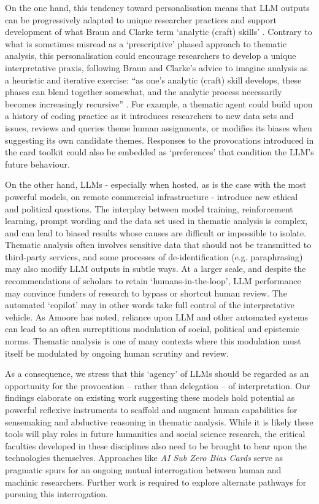 \documentclass{article}
\begin{document}
On the one hand, this tendency toward personalisation means that LLM outputs can be progressively adapted to unique researcher practices and support development of what Braun and Clarke term  `analytic (craft) skills' \cite{braunOneSizeFits2021}. Contrary to what is sometimes misread as a `prescriptive' phased approach to thematic analysis, this personalisation could encourage researchers to develop a unique interpretative praxis, following Braun and Clarke's advice to imagine analysis as a heuristic and iterative exercise: ``as one's analytic (craft) skill develops, these phases can blend together somewhat, and the analytic process necessarily becomes increasingly recursive'' \cite{braunOneSizeFits2021}. For example, a thematic agent could build upon a history of coding practice as it introduces researchers to new data sets and issues, reviews and queries theme human assignments, or modifies its biases when suggesting its own candidate themes. Responses to the provocations introduced in the card toolkit could also be embedded as `preferences' that condition the LLM's future behaviour. 

On the other hand, LLMs - especially when hosted, as is the case with the most powerful models, on remote commercial infrastructure - introduce new ethical and political questions. The interplay between model training, reinforcement learning, prompt wording and the data set used in thematic analysis is complex, and can lead to biased results whose causes are difficult or impossible to isolate. Thematic analysis often involves sensitive data that should not be transmitted to third-party services, and some processes of de-identification (e.g. paraphrasing) may also modify LLM outputs in subtle ways. At a larger scale, and despite the recommendations of scholars to retain `humans-in-the-loop', LLM performance may convince funders of research to bypass or shortcut human review. The automated `copilot' may in other words take full control of the interpretative vehicle. As Amoore \cite{Amoore_2023} has noted, reliance upon LLM and other automated systems can lead to an often surreptitious modulation of social, political and epistemic norms. Thematic analysis is one of many contexts where this modulation must itself be modulated by ongoing human scrutiny and review.

As a consequence, we stress that this `agency' of LLMs should be regarded as an opportunity for the provocation – rather than delegation – of interpretation. Our findings elaborate on existing work suggesting these models hold potential as powerful reflexive instruments   \cite{schonReflectivePractitionerHow1983} to scaffold and augment human capabilities for sensemaking and abductive reasoning \cite{kolkoAbductiveThinkingSensemaking2010} in thematic analysis. While it is likely these tools will play roles in future humanities and social science research, the critical faculties developed in these disciplines also need to be brought to bear upon the technologies themselves. Approaches like \emph{AI Sub Zero Bias Cards} serve as pragmatic spurs for an ongoing mutual interrogation between human and machinic researchers. Further work is required to explore alternate pathways for pursuing this interrogation.
\end{document}
